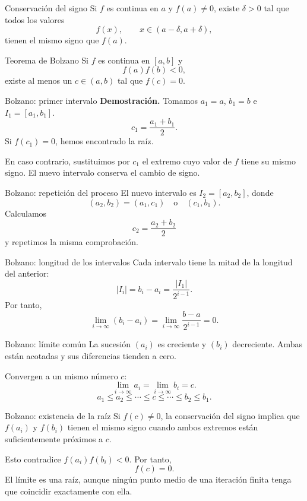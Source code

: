 \documentclass[main.tex]{subfiles}
\begin{document}
\begin{frame}{Conservación del signo}
Si $f$ es continua en $a$ y $f(a)\ne0$, existe $\delta>0$ tal que todos los valores\[f(x),\qquad x\in(a-\delta,a+\delta),\]tienen el mismo signo que $f(a)$.
\end{frame}

\begin{frame}{Teorema de Bolzano}
Si $f$ es continua en $[a,b]$ y\[f(a)f(b)<0,\]existe al menos un $c\in(a,b)$ tal que $f(c)=0$.
\end{frame}

\begin{frame}{Bolzano: primer intervalo}
\textbf{Demostración.} Tomamos $a_1=a$, $b_1=b$ e $I_1=[a_1,b_1]$.\[c_1=\frac{a_1+b_1}{2}.\]Si $f(c_1)=0$, hemos encontrado la raíz.\par\medskip En caso contrario, sustituimos por $c_1$ el extremo cuyo valor de $f$ tiene su mismo signo. El nuevo intervalo conserva el cambio de signo.
\end{frame}

\begin{frame}{Bolzano: repetición del proceso}
El nuevo intervalo es $I_2=[a_2,b_2]$, donde\[(a_2,b_2)=(a_1,c_1)\quad\text{o}\quad(c_1,b_1).\]Calculamos\[c_2=\frac{a_2+b_2}{2}\]y repetimos la misma comprobación.
\end{frame}

\begin{frame}{Bolzano: longitud de los intervalos}
Cada intervalo tiene la mitad de la longitud del anterior:\[|I_i|=b_i-a_i=\frac{|I_1|}{2^{i-1}}.\]Por tanto,\[\lim_{i\to\infty}(b_i-a_i)=\lim_{i\to\infty}\frac{b-a}{2^{i-1}}=0.\]
\end{frame}

\begin{frame}{Bolzano: límite común}
La sucesión $(a_i)$ es creciente y $(b_i)$ decreciente. Ambas están acotadas y sus diferencias tienden a cero.\par\medskip Convergen a un mismo número $c$:\[\lim_{i\to\infty}a_i=\lim_{i\to\infty}b_i=c.\]\[a_1\le a_2\le\cdots\le c\le\cdots\le b_2\le b_1.\]
\end{frame}

\begin{frame}{Bolzano: existencia de la raíz}
Si $f(c)\ne0$, la conservación del signo implica que $f(a_i)$ y $f(b_i)$ tienen el mismo signo cuando ambos extremos están suficientemente próximos a $c$.\par\medskip Esto contradice $f(a_i)f(b_i)<0$. Por tanto,\[\boxed{f(c)=0.}\]El límite es una raíz, aunque ningún punto medio de una iteración finita tenga que coincidir exactamente con ella.
\end{frame}
\end{document}
